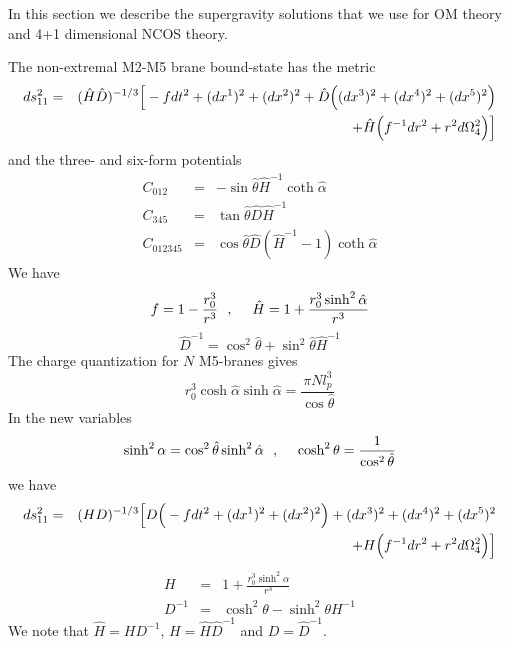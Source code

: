 \documentclass[a4paper,twoside,titlepage,12pt]{article}
\begin{document}
In this section we describe the supergravity solutions that 
we use for OM theory and 4+1 dimensional NCOS theory.

The non-extremal M2-M5 brane bound-state has the metric \cite{Russo:1997if}
%
\begin{eqnarray}
ds_{11}^2 &=& (\hat{H}\hat{D})^{-1/3} \Big[ - f dt^2 +(dx^1)^2 + (dx^2)^2
+ \hat{D} \Big( (dx^3)^2 +(dx^4)^2 + (dx^5)^2 \Big)
\nonumber \\ &&
+ \hat{H} \Big( f^{-1} dr^2 + r^2 d\Omega_4^2 \Big) \Big]
\end{eqnarray}
%
and the three- and six-form potentials
%
\begin{eqnarray}
\label{M2M5pot1}
C_{012} &=& - \sin \hat{\theta} \hat{H}^{-1} \coth \hat{\alpha}
\\
C_{345} &=& \tan \hat{\theta} \hat{D} \hat{H}^{-1}
\\
\label{M2M5pot3}
C_{012345} &=& \cos \hat{\theta} \hat{D} (\hat{H}^{-1} - 1 ) \coth \hat{\alpha}
\end{eqnarray}
%
We have
%
\begin{equation}
f = 1 - \frac{r_0^3}{r^3} \ \ ,\ \ \ \ 
\hat{H} = 1 + \frac{r_0^3 \sinh^2 \hat{\alpha}}{r^3}
\end{equation}
\begin{equation}
\hat{D}^{-1} = \cos^2 \hat{\theta} + \sin^2 \hat{\theta} \hat{H}^{-1}
\end{equation}
%
The charge quantization for $N$ M5-branes gives
\begin{equation}
r_0^3 \cosh \hat{\alpha} \sinh \hat{\alpha} 
= \frac{\pi N l_p^3}{\cos \hat{\theta}}
\end{equation}
%
In the new variables 
%
\begin{equation}
\sinh^2 \alpha = \cos^2 \hat{\theta} \sinh^2 \hat{\alpha} \ \ ,\ \ \ \ 
\cosh^2 \theta = \frac{1}{\cos^2 \hat{\theta}}
\end{equation}
%
we have
%
\begin{eqnarray}
\label{M2M5met}
ds_{11}^2 &=& (HD)^{-1/3} \Big[ D \Big( - f dt^2 +(dx^1)^2 + (dx^2)^2 \Big)
+ (dx^3)^2 +(dx^4)^2 + (dx^5)^2 
\nonumber \\ &&
+ H \Big( f^{-1} dr^2 + r^2 d\Omega_4^2 \Big) \Big]
\end{eqnarray}
%
\begin{eqnarray}
H &=& 1 + \frac{r_0^3 \sinh^2 \alpha}{r^3}
\\
D^{-1} &=& \cosh^2 \theta - \sinh^2 \theta H^{-1}
\end{eqnarray}
%
We note that \( \hat{H} = H D^{-1} \), \( H = \hat{H} \hat{D}^{-1} \)
and \( D = \hat{D}^{-1} \).
%
\end{document}
